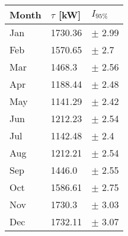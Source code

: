 \begin{tabular}{lll}
\toprule
Month & $\tau$ [kW] &   $I_{95\%}$ \\
\midrule
  Jan &     1730.36 &   $\pm$ 2.99 \\
  Feb &     1570.65 &    $\pm$ 2.7 \\
  Mar &      1468.3 &   $\pm$ 2.56 \\
  Apr &     1188.44 &   $\pm$ 2.48 \\
  May &     1141.29 &   $\pm$ 2.42 \\
  Jun &     1212.23 &   $\pm$ 2.54 \\
  Jul &     1142.48 &    $\pm$ 2.4 \\
  Aug &     1212.21 &   $\pm$ 2.54 \\
  Sep &      1446.0 &   $\pm$ 2.55 \\
  Oct &     1586.61 &   $\pm$ 2.75 \\
  Nov &      1730.3 &   $\pm$ 3.03 \\
  Dec &     1732.11 &   $\pm$ 3.07 \\
\bottomrule
\end{tabular}

